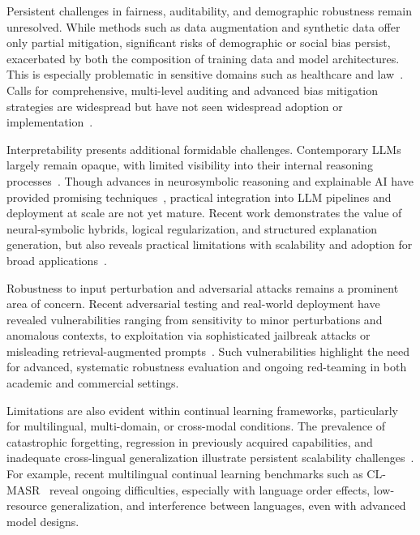 \documentclass[sigconf]{acmart}
\begin{document}
Persistent challenges in fairness, auditability, and demographic robustness remain unresolved. While methods such as data augmentation and synthetic data offer only partial mitigation, significant risks of demographic or social bias persist, exacerbated by both the composition of training data and model architectures. This is especially problematic in sensitive domains such as healthcare and law~\cite{ref2,ref15,ref18,ref19,ref49,ref50,ref55,ref90,ref91}. Calls for comprehensive, multi-level auditing and advanced bias mitigation strategies are widespread but have not seen widespread adoption or implementation~\cite{ref15,ref18,ref49,ref89,ref90}. 

Interpretability presents additional formidable challenges. Contemporary LLMs largely remain opaque, with limited visibility into their internal reasoning processes~\cite{ref24,ref34,ref37,ref38,ref41,ref43,ref48,ref54,ref89,ref92,ref93,ref94}. Though advances in neurosymbolic reasoning and explainable AI have provided promising techniques~\cite{ref43,ref49,ref92,ref93,ref89,ref54}, practical integration into LLM pipelines and deployment at scale are not yet mature. Recent work demonstrates the value of neural-symbolic hybrids, logical regularization, and structured explanation generation, but also reveals practical limitations with scalability and adoption for broad applications~\cite{ref48,ref54,ref89,ref93}.

Robustness to input perturbation and adversarial attacks remains a prominent area of concern. Recent adversarial testing and real-world deployment have revealed vulnerabilities ranging from sensitivity to minor perturbations and anomalous contexts, to exploitation via sophisticated jailbreak attacks or misleading retrieval-augmented prompts~\cite{ref13,ref39,ref55,ref56,ref60,ref77,ref78,ref82,ref91}. Such vulnerabilities highlight the need for advanced, systematic robustness evaluation and ongoing red-teaming in both academic and commercial settings.

Limitations are also evident within continual learning frameworks, particularly for multilingual, multi-domain, or cross-modal conditions. The prevalence of catastrophic forgetting, regression in previously acquired capabilities, and inadequate cross-lingual generalization illustrate persistent scalability challenges~\cite{ref70,ref80,ref81,ref82,ref83,ref102}. For example, recent multilingual continual learning benchmarks such as CL-MASR~\cite{ref102} reveal ongoing difficulties, especially with language order effects, low-resource generalization, and interference between languages, even with advanced model designs.
\end{document}
